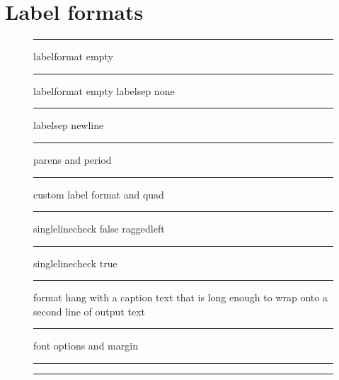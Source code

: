 \documentclass{article}
\begin{document}
\listoffigures
\section{Label formats}
\begin{figure}[htbp]\centering\rule{2cm}{.5cm}
\captionsetup{labelformat=empty}\caption{labelformat empty}\end{figure}
\begin{figure}[htbp]\centering\rule{2cm}{.5cm}
\captionsetup{labelformat=empty,labelsep=none}\caption{labelformat empty labelsep none}\end{figure}
\begin{figure}[htbp]\centering\rule{2cm}{.5cm}
\captionsetup{labelformat=simple,labelsep=newline}\caption{labelsep newline}\end{figure}
\begin{figure}[htbp]\centering\rule{2cm}{.5cm}
\captionsetup{labelformat=parens,labelsep=period}\caption{parens and period}\end{figure}
\begin{figure}[htbp]\centering\rule{2cm}{.5cm}
\captionsetup{labelformat=boldnum,labelsep=quad}\caption{custom label format and quad}\end{figure}
\begin{figure}[htbp]\centering\rule{2cm}{.5cm}
\captionsetup{singlelinecheck=false,justification=raggedleft}\caption{singlelinecheck false raggedleft}\end{figure}
\begin{figure}[htbp]\centering\rule{2cm}{.5cm}
\captionsetup{singlelinecheck=true,justification=raggedright}\caption{singlelinecheck true}\end{figure}
\begin{figure}[htbp]\centering\rule{2cm}{.5cm}
\captionsetup{format=hang,labelsep=space}\caption{format hang with a caption text that is long enough to wrap onto a second line of output text}\end{figure}
\begin{figure}[htbp]\centering\rule{2cm}{.5cm}
\caption{font options and margin}\end{figure}
\begin{figure}[htbp]\centering\rule{2cm}{.5cm}
\captionsetup{labelformat=empty}\caption{}\end{figure}
\begin{figure}[htbp]\centering\rule{2cm}{.5cm}
\caption{}\end{figure}
\end{document}
